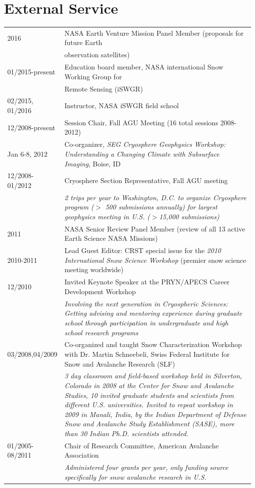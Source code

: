 \documentclass[11pt]{article}
\renewcommand\arraystretch{1}
\begin{document}
\section*{External Service}
\begingroup
\renewcommand\arraystretch{0.7}
\begin{longtable}{p{1.2in}|p{5.7in}}
2016 & NASA Earth Venture Mission Panel Member (proposals for future Earth \\ 
& observation satellites) \\
01/2015-present & Education board member, NASA international Snow Working Group for \\ 
& Remote Sensing (iSWGR) \\
02/2015, 01/2016 & Instructor, NASA iSWGR field school \\
12/2008-present & Session Chair, Fall AGU Meeting (16 total sessions 2008-2012) \\
Jan 6-8, 2012 & Co-organizer, \textit{SEG Cryosphere Geophysics Workshop: Understanding a Changing Climate with Subsurface Imaging}, Boise, ID \\
12/2008-01/2012 & Cryosphere Section Representative, Fall AGU meeting \\
&\textit{2 trips per year to Washington, D.C. to organize Cryosphere program ($>$ 500 
submissions annually) for largest geophysics meeting in U.S. ($>$15,000 submissions)} \\
2011 & NASA Senior Review Panel Member (review of all 13 active Earth Science NASA Missions)  \\
2010-2011 & Lead Guest Editor: CRST special issue for the \textit{2010 International Snow
Science Workshop} (premier snow science meeting worldwide) \\
12/2010 & Invited Keynote Speaker at the PRYN/APECS Career Development Workshop \\
& \textit{Involving the next generation in Cryospheric Sciences: Getting advising and mentoring experience during graduate school through participation in undergraduate and high school research programs} \\

\pagebreak

03/2008,04/2009 & Co-organized and taught Snow Characterization Workshop with Dr. Martin Schneebeli, Swiss Federal Institute for Snow and Avalanche Research (SLF) \\
& \textit{3 day classroom and field-based workshop held in Silverton, Colorado in 2008 at the Center for Snow and Avalanche Studies, 10 invited graduate students and scientists from different U.S. universities.  Invited to repeat workshop in 2009 in Manali, India, by the Indian Department of Defense Snow and Avalanche Study Establishment (SASE), more than 30 Indian Ph.D. scientists attended.} \\
01/2005-08/2011 & Chair of Research Committee, American Avalanche Association \\
& \textit{Administered four grants per year, only funding source specifically for snow avalanche research in U.S.} \\


\end{longtable}
\end{document}
